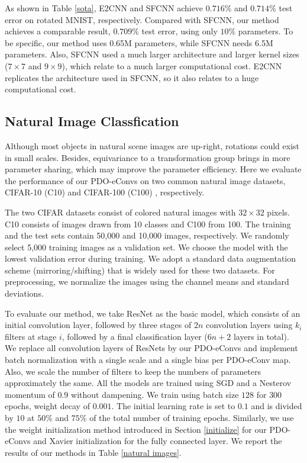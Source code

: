 \documentclass{article}
\begin{document}
As shown in Table \ref{sota}, E2CNN and SFCNN achieve $0.716\%$ and $0.714\%$ test error on rotated MNIST, respectively. Compared with SFCNN, our method achieves a comparable result, $0.709\%$ test error, using only $10\%$ parameters. To be specific, our method uses 0.65M parameters, while SFCNN needs 6.5M parameters. Also, SFCNN used a much larger architecture and larger kernel sizes ($7\times 7$ and $9\times 9$), which relate to a much larger computational cost. E2CNN replicates the architecture used in SFCNN, so it also relates to a huge computational cost.

\subsection{Natural Image Classfication}
Although most objects in natural scene images are up-right, rotations could exist in small scales. Besides, equivariance to a transformation group brings in more parameter sharing, which may improve the parameter efficiency. Here we evaluate the performance of our PDO-eConvs on two common natural image datasets, CIFAR-10 (C10) and CIFAR-100 (C100) \cite{krizhevsky2009learning}, respectively.

The two CIFAR datasets consist of colored natural images with $32\times 32$ pixels. C10 consists of images drawn from 10 classes and C100 from 100. The training and the test sets contain 50,000 and 10,000 images, respectively. We randomly select 5,000 training images as a validation set. We choose the model with the lowest validation error during training. We adopt a standard data augmentation scheme (mirroring/shifting) \cite{lee2015deeply} that is widely used for these two datasets. For preprocessing, we normalize the images using the channel means and standard deviations.

To evaluate our method, we take ResNet \cite{he2016identity} as the basic model, which consists of an initial convolution layer, followed by three stages of $2n$ convolution layers using $k_i$ filters at stage $i$, followed by a final classification layer ($6n + 2$ layers in total). We replace all convolution layers of ResNets by our PDO-eConvs and implement batch normalization with a single scale and a single bias per PDO-eConv map. Also, we scale the number of filters to keep the numbers of parameters approximately the same. All the models are trained using SGD and a Nesterov momentum \cite{sutskever2013importance} of $0.9$ without dampening. We train using batch size $128$ for $300$ epochs, weight decay of $0.001$. The initial learning rate is set to $0.1$ and is divided by $10$ at $50\%$ and $75\%$ of the total number of training epochs. Similarly, we use the weight initialization method introduced in Section \ref{initialize} for our PDO-eConvs and Xavier initialization for the fully connected layer. We report the results of our methods in Table \ref{natural images}.
\end{document}
